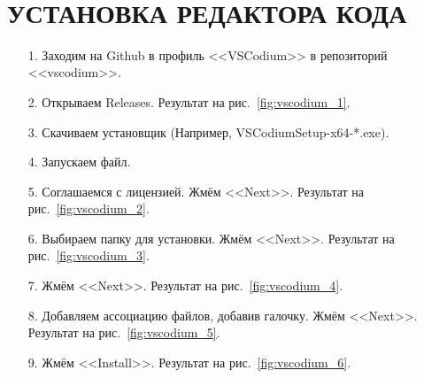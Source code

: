 

\newpage
\tableofcontents
\hspace{0pt}\\


\newpage
\section{УСТАНОВКА РЕДАКТОРА КОДА}

\begin{enumerate}
    \item[1.] Заходим на Github в профиль <<VSCodium>> в репозиторий <<vscodium>>.
    \item[2.] Открываем Releases. Результат на рис.~\ref{fig:vscodium_1}.
    \item[3.] Скачиваем установщик (Например, VSCodiumSetup-x64-*.exe).
    \item[4.] Запускаем файл.
    \item[5.] Соглашаемся с лицензией. Жмём <<Next>>. Результат на рис.~\ref{fig:vscodium_2}.
    \item[6.] Выбираем папку для установки. Жмём <<Next>>. Результат на рис.~\ref{fig:vscodium_3}.
    \item[7.] Жмём <<Next>>. Результат на рис.~\ref{fig:vscodium_4}.
    \item[8.] Добавляем ассоциацию файлов, добавив галочку. Жмём <<Next>>. Результат на рис.~\ref{fig:vscodium_5}.
    \item[9.] Жмём <<Install>>. Результат на рис.~\ref{fig:vscodium_6}.
\end{enumerate}

